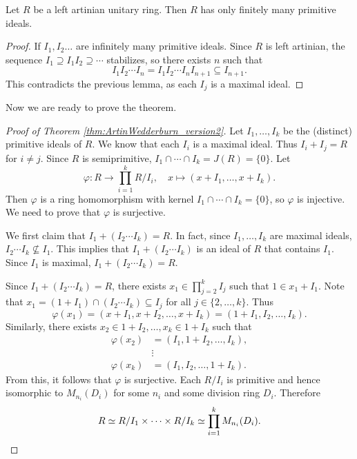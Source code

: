 \begin{lemma}
    Let $R$ be a left artinian unitary ring. Then $R$ has only 
    finitely many primitive ideals.
\end{lemma}

\begin{proof}
    If $I_1,I_2\dots$ are infinitely many primitive ideals. 
    Since $R$ is left artinian, the sequence 
    $I_1\supseteq I_1I_2\supseteq\cdots$ stabilizes, so there
    exists $n$ such that 
    \[
    I_1I_2\cdots I_n=I_1I_2\cdots I_nI_{n+1}\subseteq I_{n+1}.
    \]
    This contradicts the previous lemma, 
    as each $I_j$ is a maximal ideal. 
\end{proof}

Now we are ready to prove the theorem. 

\begin{proof}[Proof of Theorem \ref{thm:ArtinWedderburn_version2}]
    Let $I_1,\dots,I_k$ be the (distinct) primitive ideals of $R$. 
    We know that each $I_i$ is a maximal ideal. Thus $I_i+I_j=R$ for
    $i\ne j$. Since $R$ is semiprimitive, 
    $I_1\cap\cdots\cap I_k=J(R)=\{0\}$. Let 
    \[
    \varphi\colon R\to \prod_{i=1}^k R/I_i,\quad
    x\mapsto (x+I_1,\dots,x+I_k).
    \]
    Then $\varphi$ is a ring homomorphism with kernel $I_1\cap\cdots\cap I_k=\{0\}$, so
    $\varphi$ is injective. We need to prove that $\varphi$ is surjective. 
    
    We first claim that 
    $I_1+( I_2\cdots I_k) = R$. In fact, 
    since $I_1,\dots,I_k$ are maximal ideals, $I_2\cdots I_k\not\subseteq I_1$. This implies
    that $I_1+(I_2\cdots I_k)$ is an ideal of $R$ that contains $I_1$. Since $I_1$ is maximal, 
    $I_1+(I_2\cdots I_k)=R$. 
    
    Since $I_1+( I_2\cdots I_k) = R$, 
    there exists $x_1\in \prod_{j=2}^kI_j$ such that $1\in x_1+I_1$. Note that
    $x_1=(1+I_1)\cap (I_2\cdots I_k)\subseteq I_j$ for all $j\in\{2,\dots,k\}$. 
    Thus 
    \[
    \varphi(x_1)=(x+I_1,x+I_2,\dots,x+I_k)=(1+I_1,I_2,\dots, I_k).
    \]
    Similarly,
    there exists $x_2\in 1+I_2,\dots, x_k\in 1+I_k$ such that 
    \begin{align*}
    \varphi(x_2)&=(I_1,1+I_2,\dots,I_k),\\
    &\vdots\\
    \varphi(x_k)&=(I_1,I_2,\dots,1+I_k).
    \end{align*}
    From this, it follows that $\varphi$ is surjective. Each $R/I_i$ 
    is primitive and hence isomorphic to $M_{n_i}(D_i)$ for some 
    $n_i$ and some division ring $D_i$. Therefore
    \[
    R\simeq R/I_1\times\cdots\times R/I_k\simeq \prod_{i=1}^kM_{n_i}(D_i).\qedhere 
    \]
\end{proof}



